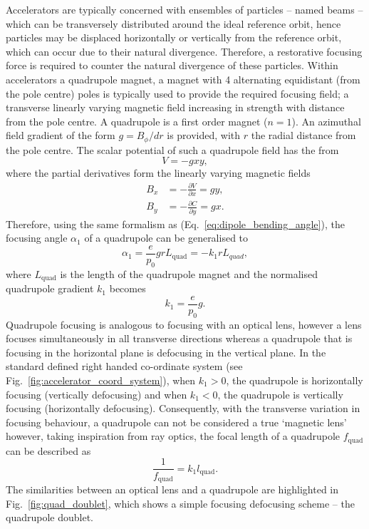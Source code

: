 \documentclass[../main.tex]{subfiles}
\begin{document}
Accelerators are typically concerned with ensembles of particles -- named beams -- which can be transversely distributed around the ideal reference orbit, hence particles may be displaced horizontally or vertically from the reference orbit, which can occur due to their natural divergence. Therefore, a restorative focusing force is required to counter the natural divergence of these particles. Within accelerators a quadrupole magnet, a magnet with 4 alternating equidistant (from the pole centre) poles is typically used to provide the required focusing field; a transverse linearly varying magnetic field increasing in strength with distance from the pole centre. A quadrupole is a first order magnet ($n=1$). An azimuthal field gradient of the form $g = B_{\phi}/dr$ is provided, with $r$ the radial distance from the pole centre. The scalar potential of such a quadrupole field has the from
\begin{equation}
V = -gxy,
\label{eq:quadrupole_potential}    
\end{equation}
where the partial derivatives form the linearly varying magnetic fields
\begin{align}
B_{x} &= -\frac{\partial V}{\partial x} = gy, \nonumber\\
B_{y} &= -\frac{\partial C}{\partial y} = gx.
\end{align}
Therefore, using the same formalism as (Eq.~\ref{eq:dipole_bending_angle}), the focusing angle $\alpha_{1}$ of a quadrupole can be generalised to
\begin{equation}
\alpha_{1} = \frac{e}{p_{0}}grL_{\mathrm{quad}} = -k_{1}rL_{quad},
\label{eq:quadrupole_focusing_angle}    
\end{equation}
where $L_{\mathrm{quad}}$ is the length of the quadrupole magnet and the normalised quadrupole gradient $k_{1}$ becomes
\begin{equation}
k_{1} = \frac{e}{p_{0}}g.
\label{eq:quadrupole_normalised_gradient}
\end{equation}
Quadrupole focusing is analogous to focusing with an optical lens, however a lens focuses simultaneously in all transverse directions whereas a quadrupole that is focusing in the horizontal plane is defocusing in the vertical plane. In the standard defined right handed co-ordinate system (see Fig.~\ref{fig:accelerator_coord_system}), when $k_{1} > 0$, the quadrupole is horizontally focusing (vertically defocusing) and when $k_{1} < 0$, the quadrupole is vertically focusing (horizontally defocusing). Consequently, with the transverse variation in focusing behaviour, a quadrupole can not be considered a true `magnetic lens' however, taking inspiration from ray optics, the focal length of a quadrupole $f_{\mathrm{quad}}$ can be described as
\begin{equation}
\frac{1}{f_{\mathrm{quad}}} = k_{1}l_{\mathrm{quad}}.
\label{eq:focal_length_quadrupole}    
\end{equation}
The similarities between an optical lens and a quadrupole are highlighted in Fig.~\ref{fig:quad_doublet}, which shows a simple focusing defocusing scheme -- the quadrupole doublet. 
\end{document}
